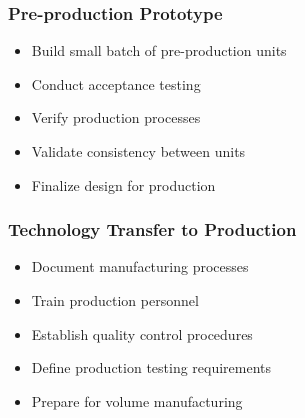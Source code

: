 \subsubsection*{Pre-production Prototype}
\begin{itemize}
  \item Build small batch of pre-production units
  \item Conduct acceptance testing
  \item Verify production processes
  \item Validate consistency between units
  \item Finalize design for production
\end{itemize}

\subsubsection*{Technology Transfer to Production}
\begin{itemize}
  \item Document manufacturing processes
  \item Train production personnel
  \item Establish quality control procedures
  \item Define production testing requirements
  \item Prepare for volume manufacturing
\end{itemize}


